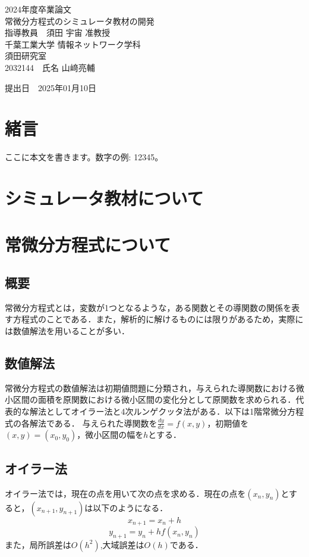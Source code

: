 \documentclass[a4paper, 12pt]{ltjsarticle}
\newcommand{\coverpage}{
\begin{titlepage}
\begin{center}
\vspace*{1.5cm}

{\LARGE 2024年度卒業論文}\\[2cm] %

{\Huge {常微分方程式のシミュレータ教材の開発}}\\[4cm] %

{\LARGE 指導教員　須田 宇宙 准教授}\\[2cm] %
{\LARGE 千葉工業大学 情報ネットワーク学科}\\[0.5cm] %

{\LARGE 須田研究室}\\[2.5cm] %

{\LARGE {2032144}　氏名 {山﨑亮輔}} \\[1.5cm] %

\vfill
\end{center}

\begin{flushright}
{\LARGE 提出日　\textnormal{2025年01月10日}}\\[1.5cm] %
\end{flushright}

\vfill
\end{titlepage}
}
\begin{document}
\coverpage

\tableofcontents

\clearpage

\section{緒言}
ここに本文を書きます。数字の例: 12345。
\clearpage
\section{シミュレータ教材について}
\clearpage
\section{常微分方程式について}
\subsection{概要}
常微分方程式とは，変数が1つとなるような，ある関数とその導関数の関係を表す方程式のことである．また，解析的に解けるものには限りがあるため，実際には数値解法を用いることが多い．
\subsection{数値解法}
常微分方程式の数値解法は初期値問題に分類され，与えられた導関数における微小区間の面積を原関数における微小区間の変化分として原関数を求められる．代表的な解法としてオイラー法と4次ルンゲクッタ法がある．以下は1階常微分方程式の各解法である．
与えられた導関数を$\frac{dy}{dx}=f(x,y)$，初期値を$(x,y)=(x_0,y_0)$，微小区間の幅を$h$とする．
\subsection{オイラー法}
オイラー法では，現在の点を用いて次の点を求める．現在の点を$(x_n,y_n)$とすると，$(x_{n+1},y_{n+1})$は以下のようになる．
\begin{equation}
  x_{n+1}=x_n+h
\end{equation}
\begin{equation}
  y_{n+1}=y_n+hf(x_n,y_n)
\end{equation}
また，局所誤差は$O(h^2)$,大域誤差は$O(h)$である．
\clearpage
\end{document}
